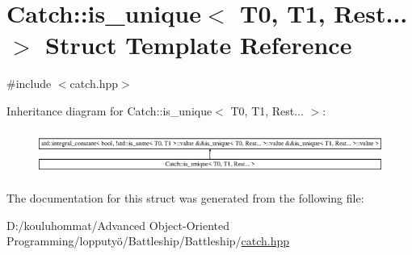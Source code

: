 \hypertarget{struct_catch_1_1is__unique_3_01_t0_00_01_t1_00_01_rest_8_8_8_01_4}{}\section{Catch\+:\+:is\+\_\+unique$<$ T0, T1, Rest... $>$ Struct Template Reference}
\label{struct_catch_1_1is__unique_3_01_t0_00_01_t1_00_01_rest_8_8_8_01_4}


{\ttfamily \#include $<$catch.\+hpp$>$}

Inheritance diagram for Catch\+:\+:is\+\_\+unique$<$ T0, T1, Rest... $>$\+:\begin{figure}[H]
\begin{center}
\leavevmode
\includegraphics[height=1.483444cm]{struct_catch_1_1is__unique_3_01_t0_00_01_t1_00_01_rest_8_8_8_01_4}
\end{center}
\end{figure}


The documentation for this struct was generated from the following file\+:\begin{DoxyCompactItemize}
\item 
D\+:/kouluhommat/\+Advanced Object-\/\+Oriented Programming/lopputyö/\+Battleship/\+Battleship/\mbox{\hyperlink{catch_8hpp}{catch.\+hpp}}\end{DoxyCompactItemize}
